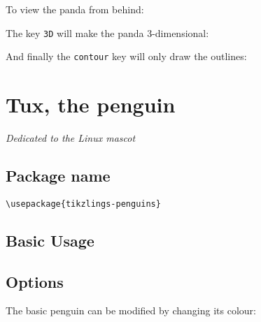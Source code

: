 \documentclass[parskip=half]{scrartcl}
\begin{document}
To view the panda from behind:
\begin{tcblisting}{}
\panda[back]
\end{tcblisting}

The key \lstinline|3D| will make the panda 3-dimensional:
\begin{tcblisting}{}
\panda[3D]
\end{tcblisting}

And finally the \lstinline|contour| key will only draw the outlines:
\begin{tcblisting}{}
\panda[contour=black]
\end{tcblisting}

%
%
\clearpage
\section[Penguin]{Tux, the penguin}

\emph{Dedicated to the Linux mascot}

\subsection{Package name}

\begin{tcolorbox}[lower separated=false, lefthand width=.8\linewidth]
\vspace*{0.5cm}
\lstinline|\usepackage{tikzlings-penguins}| 
\vspace*{0.5cm}
\end{tcolorbox}

\subsection{Basic Usage}

\begin{tcblisting}{}
\penguin
\end{tcblisting}

\subsection{Options}

The basic penguin can be modified by changing its colour:
\begin{tcblisting}{}
\penguin[body=blue]
\end{tcblisting}
\end{document}
